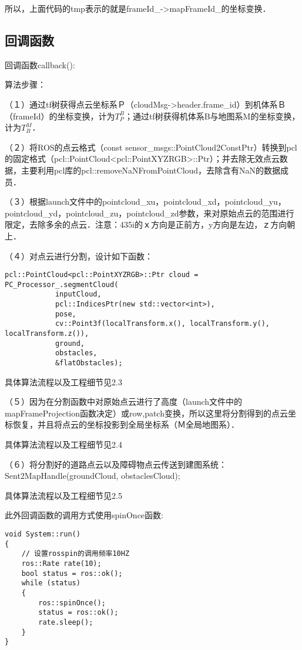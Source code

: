 \documentclass[UTF8]{ctexart}
\begin{document}
所以，上面代码的tmp表示的就是frameId_->mapFrameId_的坐标变换．

\subsection{回调函数}

回调函数callback():

算法步骤：

（１）通过tf树获得点云坐标系Ｐ（cloudMsg->header.frame_id）到机体系Ｂ（frameId）的坐标变换，计为$T^B_P$；通过tf树获得机体系B与地图系M的坐标变换，计为$T^M_B$．

（２）将ROS的点云格式（const sensor_msgs::PointCloud2ConstPtr）转换到pcl的固定格式（pcl::PointCloud<pcl::PointXYZRGB>::Ptr）；并去除无效点云数据，主要利用pcl库的pcl::removeNaNFromPointCloud，去除含有NaN的数据成员．

（３）根据launch文件中的pointcloud_xu，pointcloud_xd，pointcloud_yu，pointcloud_yd，pointcloud_zu，pointcloud_zd参数，来对原始点云的范围进行限定，去除多余的点云．注意：435i的ｘ方向是正前方，y方向是左边，ｚ方向朝上．

（４）对点云进行分割，设计如下函数：

\begin{lstlisting}[caption={}]
    pcl::PointCloud<pcl::PointXYZRGB>::Ptr cloud = PC_Processor_.segmentCloud(
			inputCloud,
			pcl::IndicesPtr(new std::vector<int>),
			pose,
			cv::Point3f(localTransform.x(), localTransform.y(), localTransform.z()),
			ground,
			obstacles,
			&flatObstacles);
\end{lstlisting}

具体算法流程以及工程细节见2.3

（５）因为在分割函数中对原始点云进行了高度（launch文件中的mapFrameProjection函数决定）或row,patch变换，所以这里将分割得到的点云坐标恢复，并且将点云的坐标投影到全局坐标系（Ｍ全局地图系）．

具体算法流程以及工程细节见2.4

（６）将分割好的道路点云以及障碍物点云传送到建图系统：Sent2MapHandle(groundCloud, obstaclesCloud);

具体算法流程以及工程细节见2.5

此外回调函数的调用方式使用spinOnce函数:

\begin{lstlisting}[caption={}]
void System::run()
{
	// 设置rosspin的调用频率10HZ
	ros::Rate rate(10);
	bool status = ros::ok();
	while (status)
	{
		ros::spinOnce();
		status = ros::ok();
		rate.sleep();
	}
}
\end{lstlisting}
\end{document}
